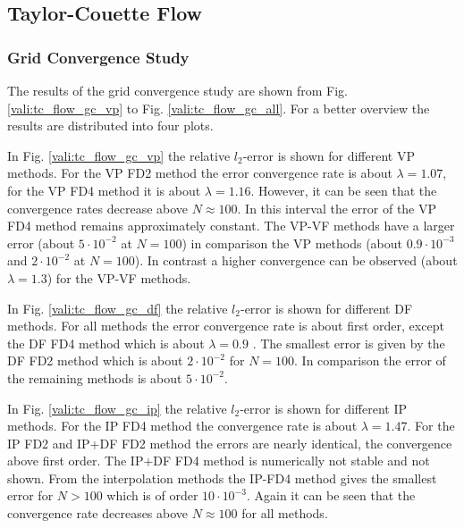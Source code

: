\clearpage
\subsection{Taylor-Couette Flow}

\subsubsection{Grid Convergence Study}


The results of the grid convergence study are shown from Fig. \ref{vali:tc_flow_gc_vp} to Fig. \ref{vali:tc_flow_gc_all}.
For a better overview the results are distributed into four plots.

In Fig. \ref{vali:tc_flow_gc_vp} the relative $l_2$-error is shown for different VP methods.
For the VP FD2 method the error convergence rate is about $\lambda=1.07$,
for the VP FD4 method it is about $\lambda=1.16$. However, it can be seen that the convergence rates decrease above $N\approx100$.
In this interval the error of the VP FD4 method remains approximately constant.
The VP-VF methods have a larger error (about $5\cdot 10^{-2}$ at $N=100$) in comparison the VP methods (about $0.9 \cdot 10^{-3}$ and  $2\cdot10^{-2}$ at $N=100$).
In contrast a higher convergence can be observed (about $\lambda=1.3$) for the VP-VF methods.

In Fig. \ref{vali:tc_flow_gc_df} the relative $l_2$-error is shown for different DF methods.
For all methods the error convergence rate is about first order, except the DF FD4 method which is about $\lambda=0.9$ .
The smallest error is given by the DF FD2 method which is about $2 \cdot 10^{-2}$ for $N=100$.
In comparison the error of the remaining methods is about $5\cdot10^{-2}$.

In Fig. \ref{vali:tc_flow_gc_ip} the relative $l_2$-error is shown for different IP methods.
For the IP FD4 method the convergence rate is about $\lambda=1.47$.
For the IP FD2 and IP+DF FD2 method the errors are nearly  identical, the convergence above first order.
The IP+DF FD4 method is numerically not stable and  not shown.
From the interpolation methods the IP-FD4 method gives the smallest error for $N>100$ which is of order $10 \cdot 10^{-3}$.
Again it can be seen that the convergence rate decreases above $N\approx100$ for all methods.


